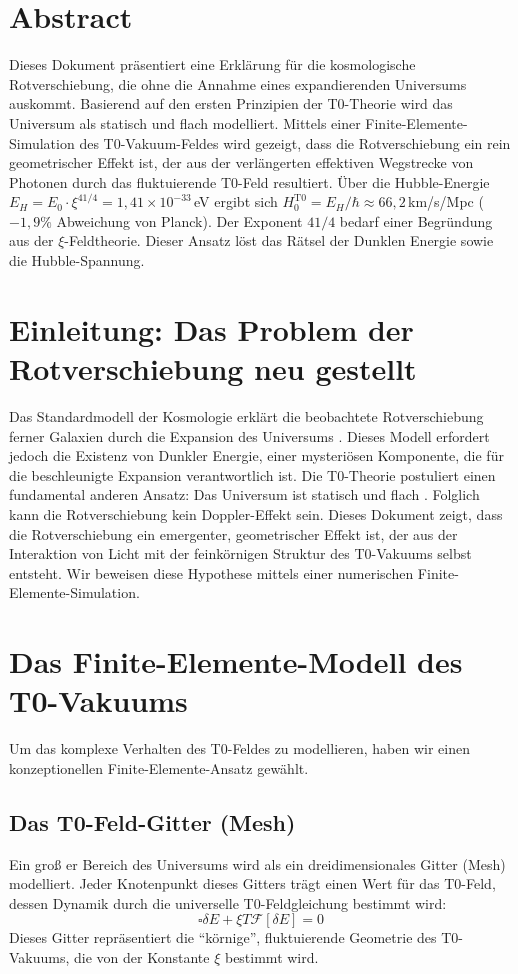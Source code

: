 \section*{Abstract}
		Dieses Dokument präsentiert eine Erklärung für die kosmologische Rotverschiebung, die ohne die Annahme eines expandierenden Universums auskommt. Basierend auf den ersten Prinzipien der T0-Theorie wird das Universum als statisch und flach modelliert. Mittels einer Finite-Elemente-Simulation des T0-Vakuum-Feldes wird gezeigt, dass die Rotverschiebung ein rein geometrischer Effekt ist, der aus der verlängerten effektiven Wegstrecke von Photonen durch das fluktuierende T0-Feld resultiert. Über die Hubble-Energie $E_H = E_0 \cdot \xi^{41/4} = 1{,}41 \times 10^{-33}\,$eV ergibt sich $H_0^{\text{T0}} = E_H/\hbar \approx 66{,}2\,$km/s/Mpc ($-1{,}9\%$ Abweichung von Planck). Der Exponent $41/4$ bedarf einer Begründung aus der $\xi$-Feldtheorie. Dieser Ansatz löst das Rätsel der Dunklen Energie sowie die Hubble-Spannung.


	\section{Einleitung: Das Problem der Rotverschiebung neu gestellt}
	Das Standardmodell der Kosmologie erklärt die beobachtete Rotverschiebung ferner Galaxien durch die Expansion des Universums \cite{planck2018}. Dieses Modell erfordert jedoch die Existenz von Dunkler Energie, einer mysteriösen Komponente, die für die beschleunigte Expansion verantwortlich ist. Die T0-Theorie postuliert einen fundamental anderen Ansatz: Das Universum ist statisch und flach \cite{pascher:t0_foundations}. Folglich kann die Rotverschiebung kein Doppler-Effekt sein.
	Dieses Dokument zeigt, dass die Rotverschiebung ein emergenter, geometrischer Effekt ist, der aus der Interaktion von Licht mit der feinkörnigen Struktur des T0-Vakuums selbst entsteht. Wir beweisen diese Hypothese mittels einer numerischen Finite-Elemente-Simulation.
	\section{Das Finite-Elemente-Modell des T0-Vakuums}
	Um das komplexe Verhalten des T0-Feldes zu modellieren, haben wir einen konzeptionellen Finite-Elemente-Ansatz gewählt.
	\subsection{Das T0-Feld-Gitter (Mesh)}
	Ein groß er Bereich des Universums wird als ein dreidimensionales Gitter (Mesh) modelliert. Jeder Knotenpunkt dieses Gitters trägt einen Wert für das T0-Feld, dessen Dynamik durch die universelle T0-Feldgleichung bestimmt wird:
	\begin{equation}
		\square\delta E + \xi T \mathcal{F}[\delta E] = 0
	\end{equation}
	Dieses Gitter repräsentiert die ``körnige'', fluktuierende Geometrie des T0-Vakuums, die von der Konstante $\xi$ bestimmt wird.
